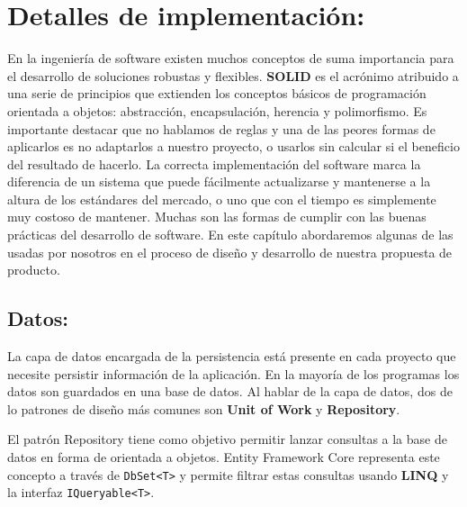 \section{Detalles de implementación:}

En la ingeniería de software existen muchos conceptos de suma importancia para el desarrollo de soluciones robustas y flexibles. \textbf{SOLID} es el acrónimo atribuido a una serie de principios que extienden los conceptos básicos de programación orientada a objetos: abstracción, encapsulación, herencia y polimorfismo. Es importante destacar que no hablamos de reglas y una de las peores formas de aplicarlos es no adaptarlos a nuestro proyecto, o usarlos sin calcular si el beneficio del resultado de hacerlo. La correcta implementación del software marca la diferencia de un sistema que puede fácilmente actualizarse y mantenerse a la altura de los estándares del mercado, o uno que con el tiempo es simplemente muy costoso de mantener. Muchas son las formas de cumplir con las buenas prácticas del desarrollo de software. En este capítulo abordaremos algunas de las usadas por nosotros en el proceso de diseño y desarrollo de nuestra propuesta de producto.

\subsection{Datos:}

La capa de datos encargada de la persistencia está presente en cada proyecto que necesite persistir información de la aplicación. En la mayoría de los programas los datos son guardados en una base de datos. Al hablar de la capa de datos, dos de lo patrones de diseño más comunes son \textbf{Unit of Work} y  \textbf{Repository}.
\newline

El patrón Repository tiene como objetivo permitir lanzar consultas a la base de datos en forma de orientada a objetos. Entity Framework Core representa este concepto a través de \lstinline{DbSet<T>}  y permite filtrar estas consultas usando \textbf{LINQ} y la interfaz \lstinline{IQueryable<T>}. 

